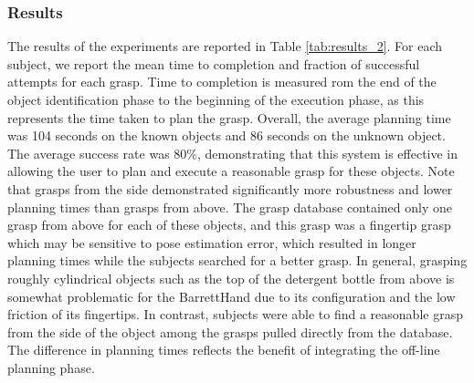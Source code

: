\subsubsection{Results}
The results of the experiments are reported in Table \ref{tab:results_2}. For each subject, we report the mean time to completion and fraction of successful attempts for each grasp. Time to completion is measured rom the end of the object identification phase to the beginning of the execution phase, as this represents the time taken to plan the grasp. Overall, the average planning time was 104 seconds on the known objects and 86 seconds on the unknown object. The average success rate was 80\%, demonstrating that this system is effective in allowing the user to plan and execute a reasonable grasp for these objects.
Note that grasps from the side demonstrated significantly more robustness and lower planning times than grasps from above. The grasp database contained only one grasp from above for each of these objects, and this grasp was a fingertip grasp which may be sensitive to pose estimation error, which resulted in longer planning times while the subjects searched for a better grasp. In general, grasping roughly cylindrical objects such as the top of the detergent bottle from above is somewhat problematic for the BarrettHand due to its configuration and the low friction of its fingertips. In contrast, subjects were able to find a reasonable grasp from the side of the object among the grasps pulled directly from the database. The difference in planning times reflects the benefit of integrating the off-line planning phase.

